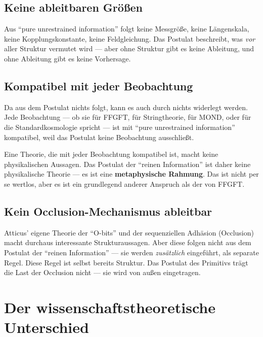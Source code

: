 \subsection{Keine ableitbaren Größen}

Aus ``pure unrestrained information'' folgt keine Messgröße, keine Längenskala, keine Kopplungskonstante, keine Feldgleichung. Das Postulat beschreibt, was \emph{vor} aller Struktur vermutet wird --- aber ohne Struktur gibt es keine Ableitung, und ohne Ableitung gibt es keine Vorhersage.

\subsection{Kompatibel mit jeder Beobachtung}

Da aus dem Postulat nichts folgt, kann es auch durch nichts widerlegt werden. Jede Beobachtung --- ob sie für FFGFT, für Stringtheorie, für MOND, oder für die Standardkosmologie spricht --- ist mit ``pure unrestrained information'' kompatibel, weil das Postulat keine Beobachtung ausschließt.

\begin{wichtig}[Nicht falsifizierbar = nicht physikalisch]
Eine Theorie, die mit jeder Beobachtung kompatibel ist, macht keine physikalischen Aussagen. Das Postulat der ``reinen Information'' ist daher keine physikalische Theorie --- es ist eine \textbf{metaphysische Rahmung}. Das ist nicht per se wertlos, aber es ist ein grundlegend anderer Anspruch als der von FFGFT.
\end{wichtig}

\subsection{Kein Occlusion-Mechanismus ableitbar}

Atticus' eigene Theorie der ``O-bits'' und der sequenziellen Adhäsion (Occlusion) macht durchaus interessante Strukturaussagen. Aber diese folgen nicht aus dem Postulat der ``reinen Information'' --- sie werden \emph{zusätzlich} eingeführt, als separate Regel. Diese Regel ist selbst bereits Struktur. Das Postulat des Primitivs trägt die Last der Occlusion nicht --- sie wird von außen eingetragen.

\section{Der wissenschaftstheoretische Unterschied}

